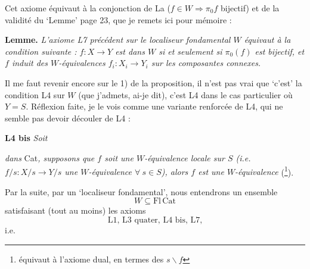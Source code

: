 Cet axiome équivaut à la conjonction de La ($f \in W \Longrightarrow \pi_0 f$ bijectif) et de la validité du ‘Lemme’ page 23, que je remets ici pour mémoire :

\textbf{Lemme.} \textit{L'axiome L7 précédent sur le localiseur fondamental $W$ équivaut à la condition suivante : $f : X \longrightarrow Y$ est dans $W$ si et seulement si $\pi_0(f)$ est bijectif, et $f$ induit des $W$-équivalences $f_i : X_i \longrightarrow Y_i$ sur les composantes connexes.}

Il me faut revenir encore sur le 1) de la proposition, il n'est pas vrai que ‘c'est’ la condition L4 sur $W$ (que j'admets, ai-je dit), c'est L4 dans le cas particulier où $Y = S$. Réflexion faite, je le vois comme une variante renforcée de L4, qui ne semble pas devoir découler de L4 :

\textbf{L4 bis} \textit{Soit}  \textit{dans} Cat\textit{, supposons que $f$ soit une $W$-équivalence locale sur $S$ (i.e. $f/s : X/s \longrightarrow Y/s$ une $W$-équivalence $\forall\ s \in S$), alors $f$ est une $W$-équivalence} (\footnote[29]{équivaut à l'axiome dual, en termes des $s\backslash f$}).

Par la suite, par un ‘localiseur fondamental’, nous entendrons un ensemble
\[
W \subseteq \mathrm{Fl}\,\mathrm{Cat}
\]
satisfaisant (tout au moins) les axioms %
\[
\text{L1, L3 quater, L4 bis, L7,}
\]
i.e.

